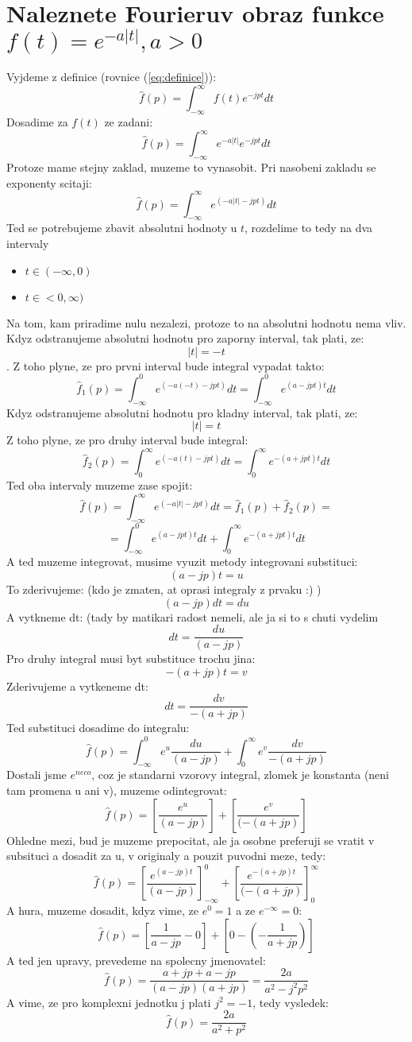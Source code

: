 \newpage

\section{Naleznete Fourieruv obraz funkce $f(t)=e^{-a|t|},a>0$}
Vyjdeme z definice (rovnice (\ref{eq:definice})):
$$\hat{f}(p)=\int_{-\infty}^{\infty}f(t)e^{-jpt}dt$$
Dosadime za $f(t)$ ze zadani:
$$\hat{f}(p)=\int_{-\infty}^{\infty}e^{-a|t|}e^{-jpt}dt$$
Protoze mame stejny zaklad, muzeme to vynasobit. Pri nasobeni zakladu se exponenty scitaji:
$$\hat{f}(p)=\int_{-\infty}^{\infty}e^{(-a|t|-jpt)}dt$$
Ted se potrebujeme zbavit absolutni hodnoty u $t$, rozdelime to tedy na dva intervaly
\begin{itemize}
\item $t \in (-\infty,0)$
\item $t \in <0,\infty)$
\end{itemize}
Na tom, kam priradime nulu nezalezi, protoze to na absolutni hodnotu nema vliv.
Kdyz odstranujeme absolutni hodnotu pro zaporny interval, tak plati, ze:
$$|t|=-t$$. 
Z toho plyne, ze pro prvni interval bude integral vypadat takto:
$$\hat{f}_1(p)=\int_{-\infty}^{0}e^{(-a(-t)-jpt)}dt=\int_{-\infty}^{0}e^{(a-jpt)t}dt$$
Kdyz odstranujeme absolutni hodnotu pro kladny interval, tak plati, ze:
$$|t|=t$$
Z toho plyne, ze pro druhy interval bude integral:
$$\hat{f}_2(p)=\int_{0}^{\infty}e^{(-a(t)-jpt)}dt=\int_{0}^{\infty}e^{-(a+jpt)t}dt$$
Ted oba intervaly muzeme zase spojit:
$$\hat{f}(p)=\int_{-\infty}^{\infty}e^{(-a|t|-jpt)}dt = \hat{f}_1(p)+\hat{f}_2(p)=$$ $$=\int_{-\infty}^{0}e^{(a-jpt)t}dt+ \int_{0}^{\infty}e^{-(a+jpt)t}dt$$
A ted muzeme integrovat, musime vyuzit metody integrovani substituci:
$$(a-jp)t=u$$
To zderivujeme: (kdo je zmaten, at oprasi integraly z prvaku :) )
$$(a-jp)dt=du$$
A vytkneme dt: (tady by matikari radost nemeli, ale ja si to s chuti vydelim
$$dt=\frac{du}{(a-jp)}$$
Pro druhy integral musi byt substituce trochu jina:
$$-(a+jp)t=v$$
Zderivujeme a vytkeneme dt:
$$dt=\frac{dv}{-(a+jp)}$$
Ted substituci dosadime do integralu:
$$\hat{f}(p)=\int_{-\infty}^{0}e^u\frac{du}{(a-jp)}+\int_{0}^{\infty}e^v\frac{dv}{-(a+jp)}$$
Dostali jsme $e^{neco}$, coz je standarni vzorovy integral, zlomek je konstanta (neni tam promena u ani v), muzeme odintegrovat:
$$\hat{f}(p)=\left[\frac{e^u}{(a-jp)}\right]+\left[\frac{e^v}{(-(a+jp)}\right]$$
Ohledne mezi, bud je muzeme prepocitat, ale ja osobne preferuji se vratit v subsituci a dosadit za u, v originaly a pouzit puvodni meze, tedy:
$$\hat{f}(p)=\left[\frac{e^{(a-jp)t}}{(a-jp)}\right]_{-\infty}^0+\left[\frac{e^{-(a+jp)t}}{(-(a+jp)}\right]_0^\infty$$
A hura, muzeme dosadit, kdyz vime, ze $e^0=1$ a ze $e^{-\infty}=0$:
$$\hat{f}(p)=\left[\frac{1}{a-jp}-0\right]+\left[0-\left(-\frac{1}{a+jp}\right)\right]$$
A ted jen upravy, prevedeme na spolecny jmenovatel:
$$\hat{f}(p)=\frac{a+jp+a-jp}{(a-jp)(a+jp)}=\frac{2a}{a^2-j^2p^2}$$
A vime, ze pro komplexni jednotku j plati $j^2 = -1$, tedy vysledek:
$$\hat{f}(p)=\frac{2a}{a^2+p^2}$$


